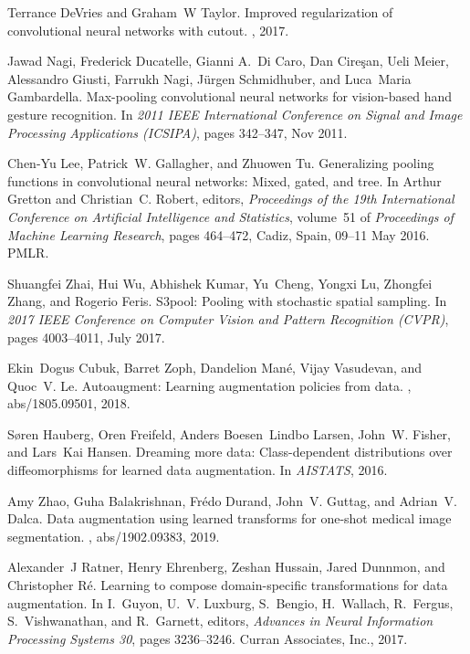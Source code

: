 \documentclass{article}
\begin{document}
{\begin{thebibliography}{10}
Terrance DeVries and Graham~W Taylor.
\newblock Improved regularization of convolutional neural networks with cutout.
, 2017.

Jawad Nagi, Frederick Ducatelle, Gianni A.~Di Caro, Dan Cireşan, Ueli Meier,
  Alessandro Giusti, Farrukh Nagi, Jürgen Schmidhuber, and Luca~Maria
  Gambardella.
\newblock Max-pooling convolutional neural networks for vision-based hand
  gesture recognition.
\newblock In {\em 2011 IEEE International Conference on Signal and Image
  Processing Applications (ICSIPA)}, pages 342--347, Nov 2011.

Chen-Yu Lee, Patrick~W. Gallagher, and Zhuowen Tu.
\newblock Generalizing pooling functions in convolutional neural networks:
  Mixed, gated, and tree.
\newblock In Arthur Gretton and Christian~C. Robert, editors, {\em Proceedings
  of the 19th International Conference on Artificial Intelligence and
  Statistics}, volume~51 of {\em Proceedings of Machine Learning Research},
  pages 464--472, Cadiz, Spain, 09--11 May 2016. PMLR.

Shuangfei Zhai, Hui Wu, Abhishek Kumar, Yu~Cheng, Yongxi Lu, Zhongfei Zhang,
  and Rogerio Feris.
\newblock S3pool: Pooling with stochastic spatial sampling.
\newblock In {\em 2017 IEEE Conference on Computer Vision and Pattern
  Recognition (CVPR)}, pages 4003--4011, July 2017.

Ekin~Dogus Cubuk, Barret Zoph, Dandelion Man{\'{e}}, Vijay Vasudevan, and
  Quoc~V. Le.
\newblock Autoaugment: Learning augmentation policies from data.
, abs/1805.09501, 2018.

S{\o}ren Hauberg, Oren Freifeld, Anders Boesen~Lindbo Larsen, John~W. Fisher,
  and Lars~Kai Hansen.
\newblock Dreaming more data: Class-dependent distributions over
  diffeomorphisms for learned data augmentation.
\newblock In {\em AISTATS}, 2016.

Amy Zhao, Guha Balakrishnan, Fr{\'{e}}do Durand, John~V. Guttag, and Adrian~V.
  Dalca.
\newblock Data augmentation using learned transforms for one-shot medical image
  segmentation.
, abs/1902.09383, 2019.

Alexander~J Ratner, Henry Ehrenberg, Zeshan Hussain, Jared Dunnmon, and
  Christopher R\'{e}.
\newblock Learning to compose domain-specific transformations for data
  augmentation.
\newblock In I.~Guyon, U.~V. Luxburg, S.~Bengio, H.~Wallach, R.~Fergus,
  S.~Vishwanathan, and R.~Garnett, editors, {\em Advances in Neural Information
  Processing Systems 30}, pages 3236--3246. Curran Associates, Inc., 2017.


\end{thebibliography}}
\end{document}
